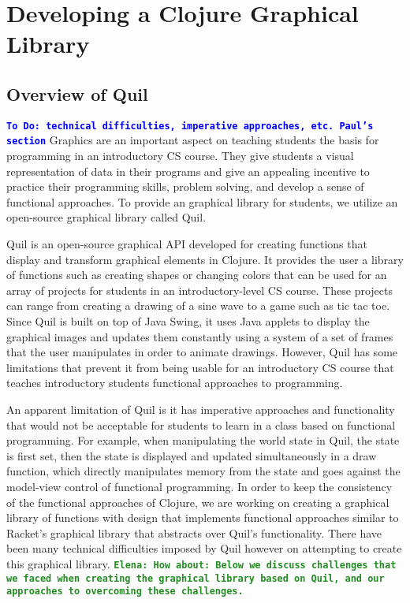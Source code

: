 \documentclass[12pt]{article}
\newcommand{\comment}[1]{{\bf \tt  {#1}}}
\newcommand{\emcomment}[1]{\textcolor{ForestGreen}{\comment{Elena: {#1}}}}
\newcommand{\todo}[1]{\textcolor{blue}{\comment{To Do: {#1}}}}
\begin{document}
\section{Developing a Clojure Graphical Library}\label{sec:library}

\subsection{Overview of Quil}\label{subsec:quil}
\todo{technical difficulties, imperative approaches, etc. Paul's section}
Graphics are an important aspect on teaching students the basis for programming in an introductory CS course. They give students a visual representation of data in their programs and give an appealing incentive to practice their programming skills, problem solving, and develop a sense of functional approaches. To provide an graphical library for students, we utilize an open-source graphical library called Quil.

Quil is an open-source graphical API developed for creating functions that display and transform graphical elements in Clojure. It provides the user a library of functions such as creating shapes or changing colors that can be used for an array of projects for students in an introductory-level CS course. These projects can range from creating a drawing of a sine wave to a game such as tic tac toe. Since Quil is built on top of Java Swing, it uses Java applets to display the graphical images and updates them constantly using a system of a set of frames that the user manipulates in order to animate drawings. However, Quil has some limitations that prevent it from being usable for an introductory CS course that teaches introductory students functional approaches to programming.

An apparent limitation of Quil is it has imperative approaches and functionality that would not be acceptable for students to learn in a class based on functional programming. For example, when manipulating the world state in Quil, the state is first set, then the state is displayed and updated simultaneously in a draw function, which directly manipulates memory from the state and goes against the model-view control of functional programming. In order to keep the consistency of the functional approaches of Clojure, we are working on creating a graphical library of functions with design that implements functional approaches similar to Racket’s graphical library that abstracts over Quil’s functionality. There have been many technical difficulties imposed by Quil however on attempting to create this graphical library.
\emcomment{How about: Below we discuss challenges that we faced when creating the graphical library based on Quil, and our approaches to overcoming these challenges.}
\end{document}
